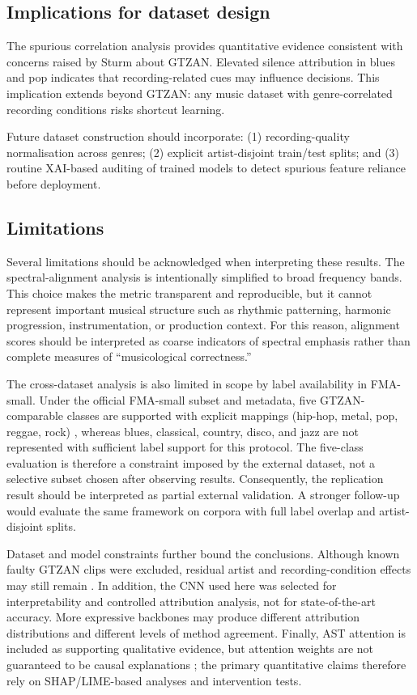 \documentclass{article}
\begin{document}
\subsection{Implications for dataset design}

The spurious correlation analysis provides quantitative evidence consistent with concerns raised by Sturm \cite{sturm2013gtzan, Sturm2014} about GTZAN. Elevated silence attribution in blues and pop indicates that recording-related cues may influence decisions. This implication extends beyond GTZAN: any music dataset with genre-correlated recording conditions risks shortcut learning.

Future dataset construction should incorporate: (1) recording-quality normalisation across genres; (2) explicit artist-disjoint train/test splits; and (3) routine XAI-based auditing of trained models to detect spurious feature reliance before deployment.

\subsection{Limitations}

Several limitations should be acknowledged when interpreting these results. The spectral-alignment analysis is intentionally simplified to broad frequency bands. This choice makes the metric transparent and reproducible, but it cannot represent important musical structure such as rhythmic patterning, harmonic progression, instrumentation, or production context. For this reason, alignment scores should be interpreted as coarse indicators of spectral emphasis rather than complete measures of ``musicological correctness.''

The cross-dataset analysis is also limited in scope by label availability in FMA-small. Under the official FMA-small subset and metadata, five GTZAN-comparable classes are supported with explicit mappings (hip-hop, metal, pop, reggae, rock) \cite{Defferrard2017}, whereas blues, classical, country, disco, and jazz are not represented with sufficient label support for this protocol. The five-class evaluation is therefore a constraint imposed by the external dataset, not a selective subset chosen after observing results. Consequently, the replication result should be interpreted as partial external validation. A stronger follow-up would evaluate the same framework on corpora with full label overlap and artist-disjoint splits.

Dataset and model constraints further bound the conclusions. Although known faulty GTZAN clips were excluded, residual artist and recording-condition effects may still remain \cite{Flexer2007}. In addition, the CNN used here was selected for interpretability and controlled attribution analysis, not for state-of-the-art accuracy. More expressive backbones may produce different attribution distributions and different levels of method agreement. Finally, AST attention is included as supporting qualitative evidence, but attention weights are not guaranteed to be causal explanations \cite{Jain2019}; the primary quantitative claims therefore rely on SHAP/LIME-based analyses and intervention tests.
\end{document}
